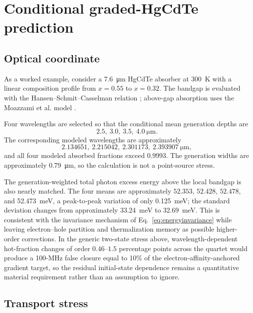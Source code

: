 \documentclass[11pt]{article}
\begin{document}
\section{Conditional graded-HgCdTe prediction}

\subsection{Optical coordinate}

As a worked example, consider a \SI{7.6}{\micro\meter} HgCdTe absorber at \SI{300}{K} with a linear composition profile from $x=0.55$ to $x=0.32$. The bandgap is evaluated with the Hansen--Schmit--Casselman relation \cite{Hansen1982}; above-gap absorption uses the Moazzami et al. model \cite{Moazzami2005}.

Four wavelengths are selected so that the conditional mean generation depths are
\begin{equation}
2.5,\ 3.0,\ 3.5,\ 4.0\ \si{\micro\meter}.
\end{equation}
The corresponding modeled wavelengths are approximately
\begin{equation}
2.134651,\ 2.215042,\ 2.301173,\ 2.393907\ \si{\micro\meter},
\end{equation}
and all four modeled absorbed fractions exceed $0.9993$. The generation widths are approximately \SI{0.79}{\micro\meter}, so the calculation is not a point-source stress.

The generation-weighted total photon excess energy above the local bandgap is also nearly matched. The four means are approximately $52.353$, $52.428$, $52.478$, and \SI{52.473}{meV}, a peak-to-peak variation of only \SI{0.125}{meV}; the standard deviation changes from approximately \SI{33.24}{meV} to \SI{32.69}{meV}. This is consistent with the invariance mechanism of Eq.~\eqref{eq:energyinvariance} while leaving electron--hole partition and thermalization memory as possible higher-order corrections. In the generic two-state stress above, wavelength-dependent hot-fraction changes of order $0.46$--$1.5$ percentage points across the quartet would produce a 100-MHz false closure equal to 10\% of the electron-affinity-anchored gradient target, so the residual initial-state dependence remains a quantitative material requirement rather than an assumption to ignore.

\subsection{Transport stress}
\end{document}
